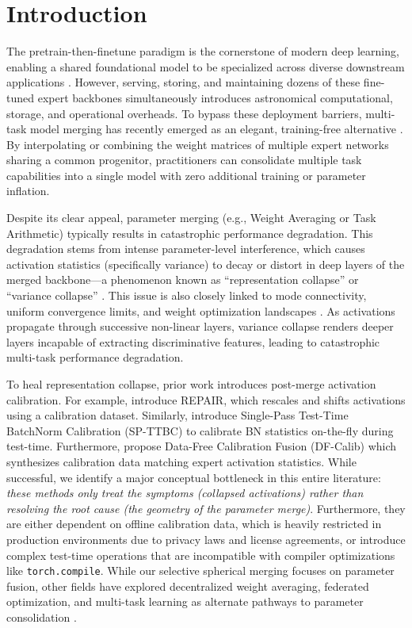 \documentclass{article}
\begin{document}
\section{Introduction}
The pretrain-then-finetune paradigm is the cornerstone of modern deep learning, enabling a shared foundational model to be specialized across diverse downstream applications \cite{wortsman2022model,hu2021lora,he2021towards,sung2022vl}. However, serving, storing, and maintaining dozens of these fine-tuned expert backbones simultaneously introduces astronomical computational, storage, and operational overheads. To bypass these deployment barriers, multi-task model merging has recently emerged as an elegant, training-free alternative \cite{wortsman2022model,ilharco2022editing}. By interpolating or combining the weight matrices of multiple expert networks sharing a common progenitor, practitioners can consolidate multiple task capabilities into a single model with zero additional training or parameter inflation.

Despite its clear appeal, parameter merging (e.g., Weight Averaging or Task Arithmetic) typically results in catastrophic performance degradation. This degradation stems from intense parameter-level interference, which causes activation statistics (specifically variance) to decay or distort in deep layers of the merged backbone---a phenomenon known as ``representation collapse'' or ``variance collapse'' \cite{jordan2023repair,pragmatist2026ttbc}. This issue is also closely linked to mode connectivity, uniform convergence limits, and weight optimization landscapes \cite{frankle2020linear,nagarajan2019uniform,neyshabur2020what}. As activations propagate through successive non-linear layers, variance collapse renders deeper layers incapable of extracting discriminative features, leading to catastrophic multi-task performance degradation.

To heal representation collapse, prior work introduces post-merge activation calibration. For example, \cite{jordan2023repair} introduce REPAIR, which rescales and shifts activations using a calibration dataset. Similarly, \cite{pragmatist2026ttbc} introduce Single-Pass Test-Time BatchNorm Calibration (SP-TTBC) to calibrate BN statistics on-the-fly during test-time. Furthermore, \cite{anonymous2026dfcalib} propose Data-Free Calibration Fusion (DF-Calib) which synthesizes calibration data matching expert activation statistics. While successful, we identify a major conceptual bottleneck in this entire literature: \emph{these methods only treat the symptoms (collapsed activations) rather than resolving the root cause (the geometry of the parameter merge)}. Furthermore, they are either dependent on offline calibration data, which is heavily restricted in production environments due to privacy laws and license agreements, or introduce complex test-time operations that are incompatible with compiler optimizations like \texttt{torch.compile}. While our selective spherical merging focuses on parameter fusion, other fields have explored decentralized weight averaging, federated optimization, and multi-task learning as alternate pathways to parameter consolidation \cite{fedavg,fedprox,fedma,scaffold}.
\end{document}
